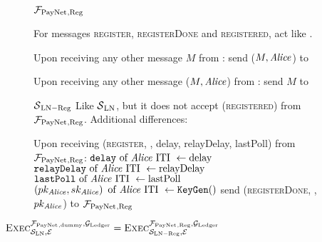 \begin{figure}[H]
  \begin{systembox}{$\mathcal{F}_{\mathrm{PayNet}}{}_{\mathrm{, Reg}}$}
    \begin{algorithmic}[1]
      \State For messages \textsc{register}, \textsc{registerDone} and
      \textsc{registered}, act like \fpaynet{}.
      \Statex

      \State Upon receiving any other message $M$ from \alice:
      \Indent
          \State send ($M, \mathit{Alice}$) to \simulator
        \EndIf
      \EndIndent
      \Statex

      \State Upon receiving any other message ($M, \mathit{Alice}$) from \simulator:
      \Indent
          \State send $M$ to \alice
        \EndIf
      \EndIndent
    \end{algorithmic}
  \end{systembox}
  \caption{}
  \label{alg:proof:fpaynet:reg}
\end{figure}

\begin{figure}[H]
  \begin{simulatorbox}{$\mathcal{S}{}_{\mathrm{LN - Reg}}$}
    Like $\mathcal{S}{}_{\mathrm{LN}}$, but it does not accept
    (\textsc{registered}) from $\mathcal{F}_{\mathrm{PayNet}}{}_{\mathrm{, Reg}}$.
    Additional differences:
    \begin{algorithmic}[1]
      \State Upon receiving (\textsc{register}, \alice, delay, relayDelay,
      lastPoll) from $\mathcal{F}_{\mathrm{PayNet}}{}_{\mathrm{, Reg}}$:
      \Indent
        \State $\mathtt{delay} \text{ of \ensuremath{\mathit{Alice}}{} ITI } \gets \mathrm{delay}$
        \label{alg:sim:reg:delay}
        \State $\mathtt{relayDelay} \text{ of \ensuremath{\mathit{Alice}}{} ITI } \gets
        \mathrm{relayDelay}$
        \State $\mathtt{lastPoll} \text{ of \ensuremath{\mathit{Alice}}{} ITI } \gets
        \mathrm{lastPoll}$
        \State $\left(pk_{\mathit{Alice}}, sk_{\mathit{Alice}}\right) \text{ of \ensuremath{\mathit{Alice}}{} ITI }
        \gets \mathtt{KeyGen}()$
        \label{alg:sim:reg:keygen}
        \State send (\textsc{registerDone}, \alice, $pk_{\mathit{Alice}}$) to
        $\mathcal{F}_{\mathrm{PayNet}}{}_{\mathrm{, Reg}}$
      \EndIndent
    \end{algorithmic}
  \end{simulatorbox}
  \caption{}
  \label{alg:sim:reg}
\end{figure}

\begin{lemma}
  \label{lemma:reg}
  $\textsc{Exec}^{\mathcal{F}_{\mathrm{PayNet}}{}_{\mathrm{, dummy}},
  \mathcal{G}_{\mathrm{Ledger}}}_{\mathcal{S}_{\mathrm{LN}}, \mathcal{E}} =
  \textsc{Exec}^{\mathcal{F}_{\mathrm{PayNet}}{}_{\mathrm{, Reg}},
  \mathcal{G}_{\mathrm{Ledger}}}_{\mathcal{S}_{\mathrm{LN - Reg}}, \mathcal{E}}$
\end{lemma}

